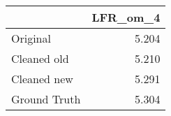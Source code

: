 \begin{tabular}{lr}
\toprule
{} & LFR_om_4 \\
\midrule
Original     &    5.204 \\
Cleaned old  &    5.210 \\
Cleaned new  &    5.291 \\
Ground Truth &    5.304 \\
\bottomrule
\end{tabular}
